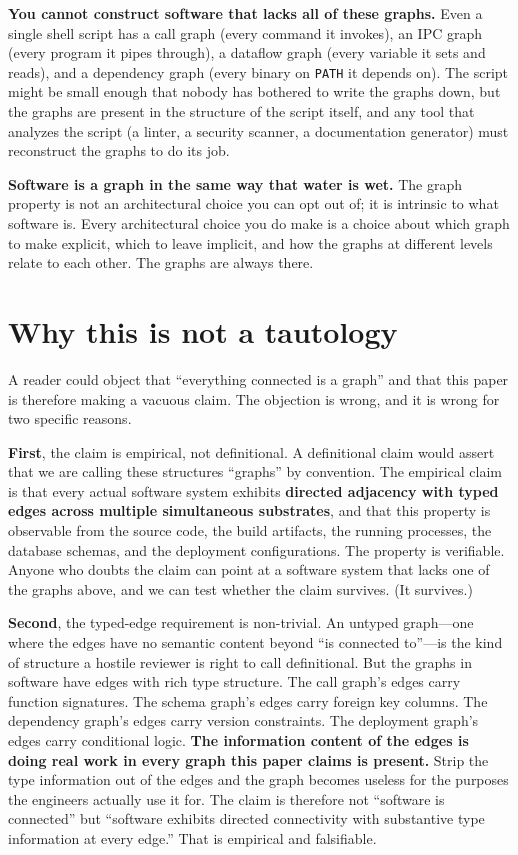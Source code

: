 \documentclass[11pt]{article}
\begin{document}
\textbf{You cannot construct software that lacks all of these graphs.} Even a single shell script has a call graph (every command it invokes), an IPC graph (every program it pipes through), a dataflow graph (every variable it sets and reads), and a dependency graph (every binary on \texttt{PATH} it depends on). The script might be small enough that nobody has bothered to write the graphs down, but the graphs are present in the structure of the script itself, and any tool that analyzes the script (a linter, a security scanner, a documentation generator) must reconstruct the graphs to do its job.

\textbf{Software is a graph in the same way that water is wet.} The graph property is not an architectural choice you can opt out of; it is intrinsic to what software is. Every architectural choice you do make is a choice about which graph to make explicit, which to leave implicit, and how the graphs at different levels relate to each other. The graphs are always there.

\section{Why this is not a tautology}
\label{sec:not-tautology}

A reader could object that ``everything connected is a graph'' and that this paper is therefore making a vacuous claim. The objection is wrong, and it is wrong for two specific reasons.

\textbf{First}, the claim is empirical, not definitional. A definitional claim would assert that we are calling these structures ``graphs'' by convention. The empirical claim is that every actual software system exhibits \textbf{directed adjacency with typed edges across multiple simultaneous substrates}, and that this property is observable from the source code, the build artifacts, the running processes, the database schemas, and the deployment configurations. The property is verifiable. Anyone who doubts the claim can point at a software system that lacks one of the graphs above, and we can test whether the claim survives. (It survives.)

\textbf{Second}, the typed-edge requirement is non-trivial. An untyped graph---one where the edges have no semantic content beyond ``is connected to''---is the kind of structure a hostile reviewer is right to call definitional. But the graphs in software have edges with rich type structure. The call graph's edges carry function signatures. The schema graph's edges carry foreign key columns. The dependency graph's edges carry version constraints. The deployment graph's edges carry conditional logic. \textbf{The information content of the edges is doing real work in every graph this paper claims is present.} Strip the type information out of the edges and the graph becomes useless for the purposes the engineers actually use it for. The claim is therefore not ``software is connected'' but ``software exhibits directed connectivity with substantive type information at every edge.'' That is empirical and falsifiable.
\end{document}
